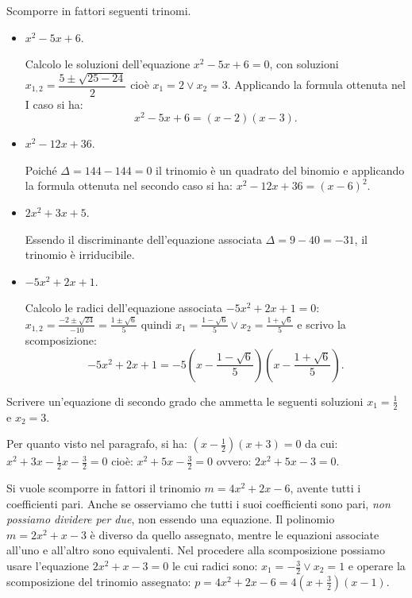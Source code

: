 \begin{esempio}
Scomporre in fattori seguenti trinomi.
\begin{itemize}
\item $x^{2} - 5 x + 6$.

Calcolo le soluzioni dell'equazione $x^{2} - 5 x + 6 = 0$, con soluzioni 
$x_{1,2} = \dfrac{5 \pm \sqrt{25 - 24}}{2}$ cioè $x_{1} = 2 \vee x_{2} = 3$. 
Applicando la formula ottenuta nel I caso si ha: \[x^{2} - 5 x + 6=( x - 2 ) ( 
x 
- 3 ).\]
\item $x^{2} - 12 x + 36$.

Poiché $\Delta = 144 - 144 = 0$ il trinomio è un quadrato del binomio e 
applicando la formula ottenuta nel secondo caso si ha: $x^{2} - 12 x + 36=( x - 
6 )^{2}$.
\item $2 x^{2} + 3 x + 5$.

Essendo il discriminante dell'equazione associata $\Delta=9 - 40= - 31$, 
il trinomio è irriducibile.
\item $- 5 x^{2} + 2 x + 1$.

Calcolo le radici dell'equazione associata $- 5 x^{2} + 2 x + 1 = 0$: $x_{1,2} 
= 
\frac{- 2 \pm \sqrt{24}}{- 10} = \frac{1 \pm \sqrt{6}}{5}$ quindi $x_{1} = 
\frac{1 - \sqrt{6}}{5} \vee x_{2} = \frac{1 + \sqrt{6}}{5}$ e scrivo la 
scomposizione: \[- 5 x^{2} + 2 x + 1=- 5 \left( x - \frac{1 - \sqrt{6}}{5} 
\right) \left( x - \frac{1 + \sqrt{6}}{5} \right).\]
\end{itemize}
\end{esempio}

\begin{esempio}
Scrivere un'equazione di secondo grado che ammetta le seguenti soluzioni $x_{1} 
= \frac{1}{2}$ e $x_{2} = 3$.

Per quanto visto nel paragrafo, si ha: $\left(x-\frac{1}{2} \right) \left(x + 3 
\right)=0$ da cui: $x^{2} + 3 x-\frac{1}{2} x - \frac{3}{2}=0$ cioè: $x^{2} + 5 
x - \frac{3}{2}=0$ ovvero: $2 x^{2} + 5 x-3=0$.
\end{esempio}

\osservazione
Si vuole scomporre in fattori il trinomio $m = 4 x^{2} + 2 x - 6$, avente tutti 
i coefficienti pari. Anche se osserviamo che tutti i suoi coefficienti sono 
pari, \emph{non possiamo dividere per due}, non essendo una equazione. Il 
polinomio $m = 2 x^{2} + x - 3$ è diverso da quello assegnato, mentre le 
equazioni associate all'uno e all'altro sono equivalenti. Nel procedere alla 
scomposizione possiamo usare l'equazione $2 x^{2} + x - 3 = 0$ le cui radici 
sono:
$x_{1} = - \frac{3}{2} \vee x_{2} = 1$ e operare la scomposizione del trinomio 
assegnato: $p = 4 x^{2} + 2 x - 6 = 4 \left( x + \frac{3}{2} \right) ( x - 1)$.

